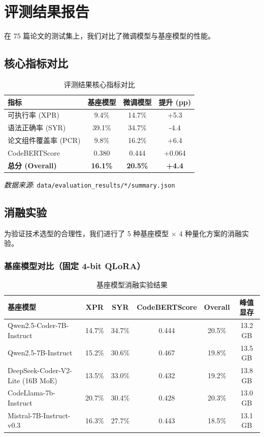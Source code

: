 \documentclass[a4paper]{article}
\begin{document}
\section{评测结果报告}
在 75 篇论文的测试集上，我们对比了微调模型与基座模型的性能。

\subsection{核心指标对比}
\begin{table}[h!]
\centering
\begin{tabularx}{\textwidth}{Xccc}
\toprule
\textbf{指标} & \textbf{基座模型} & \textbf{微调模型} & \textbf{提升 (pp)} \\
\midrule
可执行率 (XPR) & 9.4\% & 14.7\% & +5.3 \\
语法正确率 (SYR) & 39.1\% & 34.7\% & -4.4 \\
论文组件覆盖率 (PCR) & 9.8\% & 16.2\% & +6.4 \\
CodeBERTScore & 0.380 & 0.444 & +0.064 \\
\textbf{总分 (Overall)} & \textbf{16.1\%} & \textbf{20.5\%} & \textbf{+4.4} \\
\bottomrule
\end{tabularx}
\caption{评测结果核心指标对比}
\end{table}

\noindent
\textit{数据来源}: \texttt{data/evaluation\_results/*/summary.json}

\subsection{消融实验}
为验证技术选型的合理性，我们进行了 5 种基座模型 × 4 种量化方案的消融实验。

\FloatBarrier

\subsubsection{基座模型对比（固定 4-bit QLoRA）}
\begin{table}[htbp]
\centering
\begin{tabularx}{\textwidth}{Xccccc}
\toprule
\textbf{基座模型} & \textbf{XPR} & \textbf{SYR} & \textbf{CodeBERTScore} & \textbf{Overall} & \textbf{峰值显存} \\
\midrule
Qwen2.5-Coder-7B-Instruct & 14.7\% & 34.7\% & 0.444 & 20.5\% & 13.2 GB \\
Qwen2.5-7B-Instruct & 15.2\% & 30.6\% & 0.467 & 19.8\% & 13.5 GB \\
DeepSeek-Coder-V2-Lite (16B MoE) & 13.5\% & 33.0\% & 0.432 & 19.2\% & 13.8 GB \\
CodeLlama-7b-Instruct & 20.7\% & 30.4\% & 0.428 & 20.3\% & 13.0 GB \\
Mistral-7B-Instruct-v0.3 & 16.3\% & 27.7\% & 0.443 & 18.5\% & 13.1 GB \\
\bottomrule
\end{tabularx}
\caption{基座模型消融实验结果}
\end{table}
\end{document}
